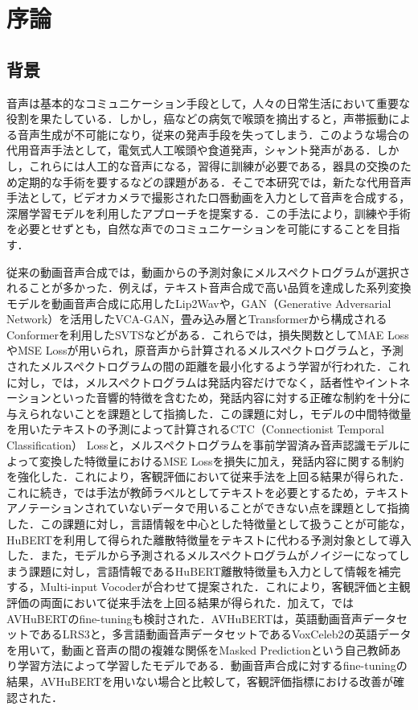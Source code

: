 \section{序論}
\subsection{背景}
音声は基本的なコミュニケーション手段として，人々の日常生活において重要な役割を果たしている．しかし，癌などの病気で喉頭を摘出すると，声帯振動による音声生成が不可能になり，従来の発声手段を失ってしまう．このような場合の代用音声手法として，電気式人工喉頭や食道発声，シャント発声がある．しかし，これらには人工的な音声になる，習得に訓練が必要である，器具の交換のため定期的な手術を要するなどの課題がある．そこで本研究では，新たな代用音声手法として，ビデオカメラで撮影された口唇動画を入力として音声を合成する，深層学習モデルを利用したアプローチを提案する．この手法により，訓練や手術を必要とせずとも，自然な声でのコミュニケーションを可能にすることを目指す．

従来の動画音声合成では，動画からの予測対象にメルスペクトログラムが選択されることが多かった．例えば，テキスト音声合成で高い品質を達成した系列変換モデル\cite{shen2018natural}を動画音声合成に応用したLip2Wav\cite{prajwal2020learning}や，GAN（Generative Adversarial Network）を活用したVCA-GAN\cite{kim2021lip}，畳み込み層とTransformer\cite{vaswani2017attention}から構成されるConformer\cite{gulati2020conformer}を利用したSVTS\cite{mira2022svts}などがある．これらでは，損失関数としてMAE LossやMSE Lossが用いられ，原音声から計算されるメルスペクトログラムと，予測されたメルスペクトログラムの間の距離を最小化するよう学習が行われた．これに対し，\cite{kim2023lip_multitask}では，メルスペクトログラムは発話内容だけでなく，話者性やイントネーションといった音響的特徴を含むため，発話内容に対する正確な制約を十分に与えられないことを課題として指摘した．この課題に対し，モデルの中間特徴量を用いたテキストの予測によって計算されるCTC（Connectionist Temporal Classification） Lossと，メルスペクトログラムを事前学習済み音声認識モデルによって変換した特徴量におけるMSE Lossを損失に加え，発話内容に関する制約を強化した．これにより，客観評価において従来手法を上回る結果が得られた．これに続き，\cite{choi2023intelligible}では手法\cite{kim2023lip_multitask}が教師ラベルとしてテキストを必要とするため，テキストアノテーションされていないデータで用いることができない点を課題として指摘した．この課題に対し，言語情報を中心とした特徴量として扱うことが可能な，HuBERT\cite{hsu2021hubert}を利用して得られた離散特徴量をテキストに代わる予測対象として導入した．また，モデルから予測されるメルスペクトログラムがノイジーになってしまう課題に対し，言語情報であるHuBERT離散特徴量も入力として情報を補完する，Multi-input Vocoderが合わせて提案された．これにより，客観評価と主観評価の両面において従来手法を上回る結果が得られた．加えて，\cite{choi2023intelligible}ではAVHuBERT\cite{shi2022learning}のfine-tuningも検討された．AVHuBERTは，英語動画音声データセットであるLRS3\cite{afouras2018lrs3}と，多言語動画音声データセットであるVoxCeleb2\cite{chung2018voxceleb2}の英語データを用いて，動画と音声の間の複雑な関係をMasked Predictionという自己教師あり学習方法によって学習したモデルである．動画音声合成に対するfine-tuningの結果，AVHuBERTを用いない場合と比較して，客観評価指標における改善が確認された．

